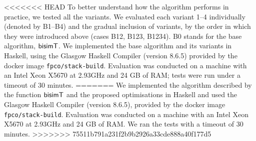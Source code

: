 <<<<<<< HEAD
To better understand how the algorithm performs in practice, we tested
all the variants. We evaluated each variant 1--4 individually (denoted
by B1--B4) and the gradual inclusion of variants, by the
order in which they were introduced above (cases B12, B123, B1234).
B0 stands for the base algorithm, $\mathsf{bisimT}$.
%
  We implemented the base algorithm and its
  variants %
  in Haskell, using the Glasgow Haskell Compiler (version 8.6.5)
  provided by the docker image \texttt{fpco/stack-build}. %
  Evaluation was conducted on a machine with an Intel Xeon X5670 at
  2.93GHz and 24 GB of RAM; tests were run under a timeout of 30
  minutes.
=======
We implemented the algorithm described by the function $\mathsf{bisimT}$ 
and the proposed optimisations
in
Haskell and used the Glasgow Haskell Compiler (version
8.6.5), provided by the docker image
\texttt{fpco/stack-build}. 
Evaluation was conducted on a machine with
an Intel Xeon X5670 at 2.93GHz and 24 GB of RAM.
We ran the tests with a timeout of 30 minutes. 
>>>>>>> 75511b791a231f2b9b2926a33cde888a40f177d5

